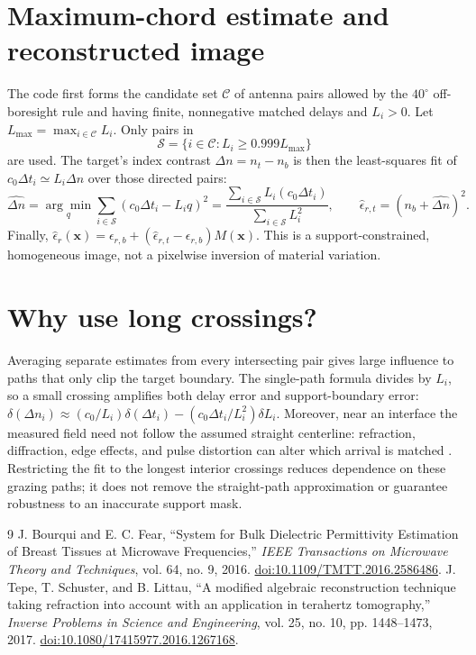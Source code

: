 \documentclass[11pt]{article}
\begin{document}
\section*{Maximum-chord estimate and reconstructed image}
The code first forms the candidate set $\mathcal C$ of antenna pairs allowed by the $40^\circ$ off-boresight rule and having finite, nonnegative matched delays and $L_i>0$. Let $L_{\max}=\max_{i\in\mathcal C}L_i$. Only pairs in
\begin{equation}
 \mathcal{S}=\{i\in\mathcal C:L_i\geq0.999L_{\max}\}
\end{equation}
are used. The target's index contrast $\Delta n=n_t-n_b$ is then the least-squares fit of $c_0\Delta t_i\simeq L_i\Delta n$ over those directed pairs:
\begin{equation}
 \widehat{\Delta n}
 =\underset{q}{\arg\min}\sum_{i\in\mathcal S}(c_0\Delta t_i-L_iq)^2
 =\frac{\sum_{i\in\mathcal S}L_i(c_0\Delta t_i)}
        {\sum_{i\in\mathcal S}L_i^2},
 \qquad
 \widehat{\epsilon}_{r,t}=(n_b+\widehat{\Delta n})^2.
 \label{eq:fit}
\end{equation}
Finally, $\widehat{\epsilon}_r(\mathbf{x})=\epsilon_{r,b}+(\widehat{\epsilon}_{r,t}-\epsilon_{r,b})M(\mathbf{x})$. This is a support-constrained, homogeneous image, not a pixelwise inversion of material variation.

\section*{Why use long crossings?}
Averaging separate estimates from every intersecting pair gives large influence to paths that only clip the target boundary. The single-path formula divides by $L_i$, so a small crossing amplifies both delay error and support-boundary error: $\delta(\Delta n_i)\approx(c_0/L_i)\delta(\Delta t_i)-(c_0\Delta t_i/L_i^2)\delta L_i$. Moreover, near an interface the measured field need not follow the assumed straight centerline: refraction, diffraction, edge effects, and pulse distortion can alter which arrival is matched \cite{tepe2017,bourqui2016}. Restricting the fit to the longest interior crossings reduces dependence on these grazing paths; it does not remove the straight-path approximation or guarantee robustness to an inaccurate support mask.

\begin{thebibliography}{9}
 J. Bourqui and E. C. Fear, ``System for Bulk Dielectric Permittivity Estimation of Breast Tissues at Microwave Frequencies,'' \emph{IEEE Transactions on Microwave Theory and Techniques}, vol. 64, no. 9, 2016. \href{https://doi.org/10.1109/TMTT.2016.2586486}{doi:10.1109/TMTT.2016.2586486}.
 J. Tepe, T. Schuster, and B. Littau, ``A modified algebraic reconstruction technique taking refraction into account with an application in terahertz tomography,'' \emph{Inverse Problems in Science and Engineering}, vol. 25, no. 10, pp. 1448--1473, 2017. \href{https://doi.org/10.1080/17415977.2016.1267168}{doi:10.1080/17415977.2016.1267168}.
\end{thebibliography}
\end{document}
